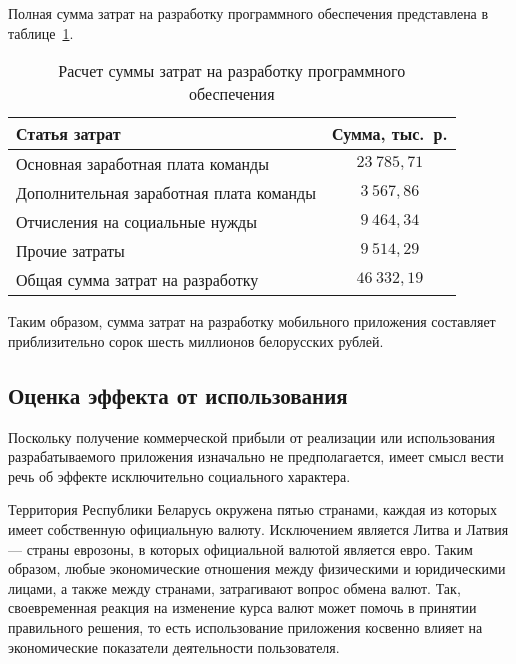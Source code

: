 Полная сумма затрат на разработку программного обеспечения представлена
в таблице~\ref{tbl:teo_sum_cost}.

\begin{table} [h!]
  \caption{
    Расчет суммы затрат на разработку программного \\
    \hspace{29.5mm} обеспечения
  }\label{tbl:teo_sum_cost}
  \begin{tabular}{| m{13.5cm} | c |}
    \hline

    \parbox{13.5cm}{
    \smallskip
    \centering Статья затрат
    \smallskip
    }
    &
      \parbox{2cm}{
      \smallskip
      \centering Сумма, тыс.~р.
    \smallskip
    } \\
    \hline

    Основная заработная плата команды
    & \( 23 \: 785{,}71 \)\\
    \hline

    Дополнительная заработная плата команды
    & \( 3 \: 567{,}86 \)\\
    \hline

    Отчисления на социальные нужды
    & \( 9 \: 464{,}34 \)\\
    \hline

    Прочие затраты
    & \( 9 \: 514{,}29 \)\\
    \hline

    Общая сумма затрат на разработку
    & \( 46 \: 332{,}19 \) \\
    \hline
  \end{tabular}
\end{table}

Таким образом, сумма затрат на разработку мобильного приложения
составляет приблизительно сорок шесть миллионов белорусских рублей.

\subsection{Оценка эффекта от использования}

Поскольку получение коммерческой прибыли от реализации или использования
разрабатываемого приложения изначально не предполагается,
имеет смысл вести речь об эффекте исключительно социального характера.

Территория Республики Беларусь окружена пятью странами, каждая из которых
имеет собственную официальную валюту. Исключением является Литва и Латвия ---
страны еврозоны, в которых официальной валютой является евро. Таким
образом, любые экономические отношения между физическими и юридическими лицами,
а также между странами, затрагивают вопрос обмена валют.
Так, своевременная реакция на изменение курса валют может помочь
в принятии правильного решения, то есть использование приложения
косвенно влияет на экономические показатели деятельности пользователя.
